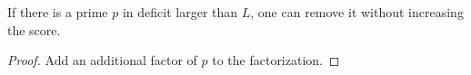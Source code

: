 \begin{sublemma}
\label{score-lower-2}
\leanok
If there is a prime $p$ in deficit larger than $L$, one can remove it without
  increasing the score.
\end{sublemma}
\begin{proof}
\leanok
Add an additional factor of $p$ to the factorization.
\end{proof}
